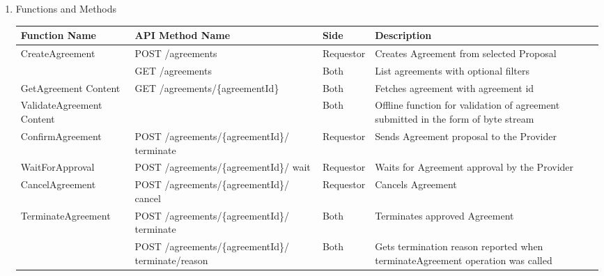 \begin{enumerate}
\begin{enumerate}
\item Functions and Methods

\begin{table}[H]
\footnotesize

\begin{center}
\begin{tabular}{|p{3cm}|p{7cm}|p{1.5cm}|p{4cm}|} 
\hline
\rowcolor{lightgray}	Function Name	& API Method Name							& 	Side	&	Description \\
\hline

CreateAgreement		&	POST /agreements											& Requestor	&	Creates Agreement from selected Proposal \\
\hline

					&	GET /agreements												&	Both	&	List agreements with optional filters \\
\hline

GetAgreement \newline Content	&	GET /agreements/\{agreementId\}					&	Both	&	Fetches  agreement with agreement id \\
\hline

ValidateAgreement \newline Content &												&	Both	&	Offline function for validation of agreement submitted in the form of byte stream \\
\hline

ConfirmAgreement	& POST /agreements/\{agreementId\}/ \newline terminate			& Requestor & 	Sends Agreement proposal to the Provider \\
\hline

WaitForApproval		& POST /agreements/\{agreementId\}/ \newline wait				& Requestor & 	Waits for Agreement approval by the Provider \\
\hline

CancelAgreement		& POST /agreements/\{agreementId\}/ \newline cancel				& Requestor &	Cancels Agreement	\\
\hline

TerminateAgreement	& POST /agreements/\{agreementId\}/ \newline terminate			& Both		&	Terminates approved Agreement \\
\hline

					& POST /agreements/\{agreementId\}/ \newline terminate/reason 	& Both 		& 	Gets termination reason reported when terminateAgreement operation was called \\
\hline					


\end{tabular}
\end{center}
\end{table}
\end{enumerate}
\end{enumerate}
